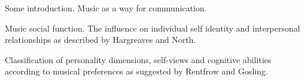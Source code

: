
Some introduction.
Music as a way for communication.

Music social function.
The influence on individual self identity and interpersonal relationships as described by Hargreaves and North.

Classification of personality dimensions, self-views and cognitive abilities according to musical preferences as suggested by Rentfrow and Gosling.

